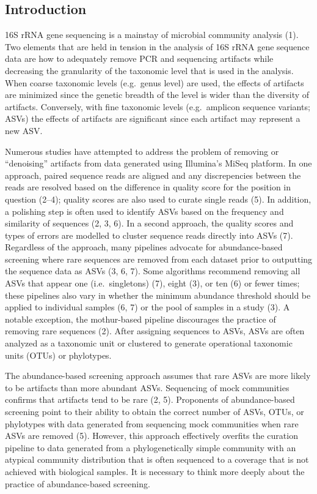 \documentclass[
]{article}
\begin{document}
\newpage

\hypertarget{introduction}{%
\subsection{Introduction}\label{introduction}}

16S rRNA gene sequencing is a mainstay of microbial community analysis
(1). Two elements that are held in tension in the analysis of 16S rRNA
gene sequence data are how to adequately remove PCR and sequencing
artifacts while decreasing the granularity of the taxonomic level that
is used in the analysis. When coarse taxonomic levels (e.g.~genus level)
are used, the effects of artifacts are minimized since the genetic
breadth of the level is wider than the diversity of artifacts.
Conversely, with fine taxonomic levels (e.g.~amplicon sequence variants;
ASVs) the effects of artifacts are significant since each artifact may
represent a new ASV.

Numerous studies have attempted to address the problem of removing or
``denoising'' artifacts from data generated using Illumina's MiSeq
platform. In one approach, paired sequence reads are aligned and any
discrepencies between the reads are resolved based on the difference in
quality score for the position in question (2--4); quality scores are
also used to curate single reads (5). In addition, a polishing step is
often used to identify ASVs based on the frequency and similarity of
sequences (2, 3, 6). In a second approach, the quality scores and types
of errors are modelled to cluster sequence reads directly into ASVs (7).
Regardless of the approach, many pipelines advocate for abundance-based
screening where rare sequences are removed from each dataset prior to
outputting the sequence data as ASVs (3, 6, 7). Some algorithms
recommend removing all ASVs that appear one (i.e.~singletons) (7), eight
(3), or ten (6) or fewer times; these pipelines also vary in whether the
minimum abundance threshold should be applied to individual samples (6,
7) or the pool of samples in a study (3). A notable exception, the
mothur-based pipeline discourages the practice of removing rare
sequences (2). After assigning sequences to ASVs, ASVs are often
analyzed as a taxonomic unit or clustered to generate operational
taxonomic units (OTUs) or phylotypes.

The abundance-based screening approach assumes that rare ASVs are more
likely to be artifacts than more abundant ASVs. Sequencing of mock
communities confirms that artifacts tend to be rare (2, 5). Proponents
of abundance-based screening point to their ability to obtain the
correct number of ASVs, OTUs, or phylotypes with data generated from
sequencing mock communities when rare ASVs are removed (5). However,
this approach effectively overfits the curation pipeline to data
generated from a phylogenetically simple community with an atypical
community distribution that is often sequenced to a coverage that is not
achieved with biological samples. It is necessary to think more deeply
about the practice of abundance-based screening.
\end{document}
